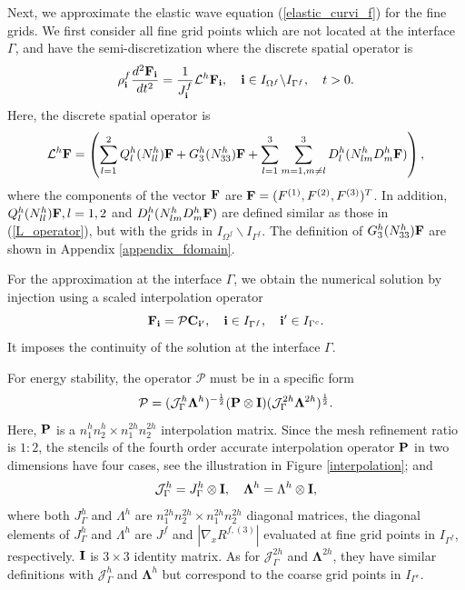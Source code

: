 Next, we approximate the elastic wave equation (\ref{elastic_curvi_f}) for the fine grids. We first consider all fine grid points which are not located at the interface $\Gamma$, and have the semi-discretization where the discrete spatial operator is
\begin{equation}\label{elastic_semi_f}
{\rho}_{\bf i}^{f}\frac{d^2{{\bf F}_{\bf i}}}{dt^2} = \frac{1}{J^f_{\bf i}}{\mathcal{L}}^{h} {{\bf F}}_{\bf i},\quad {\bf i}\in I_{\Omega^f}\backslash I_{{\Gamma^f}},\quad t>0.
\end{equation}
Here, the discrete spatial operator is
\begin{equation}\label{Lf_operator}
{\mathcal{L}}^{h} {{\bf F}} = \left(\sum_{l=1}^2{Q}_l^{h}({N}_{ll}^h){\bf F}+{G}_3^{h}({N}_{33}^h){\bf F}+\sum_{l=1}^3\sum_{m=1,m\neq l}^3{D}_l^{h}({N}_{lm}^{h}{D}_m^{h}{\bf F})\right),
\end{equation}
where the components of the vector ${\bf F}$ are ${\bf F} = (F^{(1)}, F^{(2)}, F^{(3)})^T$. In addition, ${Q}_l^{h}({N}_{ll}^h){\bf F}, l = 1,2$ and ${D}_l^{h}({N}_{lm}^{h}{D}_m^{h}{\bf F})$ are defined similar as those in (\ref{L_operator}), but with the grids in $I_{\Omega^f}\backslash I_{{\Gamma^f}}$. {\color{red} The definition of ${{G}}_3^{h}({N}_{33}^{h}){\bf F}$ are shown in Appendix \ref{appendix_fdomain}.}

For the approximation at the interface $\Gamma$, we obtain the numerical solution by injection using a scaled interpolation operator
\begin{equation}\label{continuous_sol}
{\bf F}_{\bf i} = {\mathcal{P}}{\bf C}_{{\bf i}'},\quad {\bf i}\in I_{\Gamma^f},\quad {{\bf i}'}\in I_{\Gamma^c}.
\end{equation}
It imposes the continuity of the solution at the interface $\Gamma$. 

For energy stability, the operator ${\mathcal{P}}$ must be in a specific form
\[{\mathcal{P}} = (\mathcal{J}^h_\Gamma \bm{\Lambda}^h)^{-\frac{1}{2}}({\bf P}\otimes{\bf I})(\mathcal{J}^{2h}_\Gamma \bm{\Lambda}^{2h})^{\frac{1}{2}}.\]
Here, ${\bf P}$ is a $n_1^hn_2^h\times n_1^{2h}n_2^{2h}$ interpolation matrix. Since the mesh refinement ratio is $1:2$, the stencils of the fourth order accurate interpolation operator ${\bf P}$ in two dimensions have four cases, see the illustration in  Figure \ref{interpolation}; and 
\[\mathcal{J}_{\Gamma}^h = J^{h}_{\Gamma} \otimes {\bf I},\quad {\bm{\Lambda}^h} = \Lambda^h\otimes {\bf I},\]
where both $J_{\Gamma}^h$ and $\Lambda^h$ are $n_1^{2h}n_2^{2h}\times n_1^{2h}n_2^{2h}$ diagonal matrices, the diagonal elements of $J_{\Gamma}^h$ and $\Lambda^{h}$ are $J^f$ and $|\nabla_x R^{f,(3)}|$ evaluated at fine grid points in $I_{\Gamma^f}$, respectively. ${\bf I}$ is $3\times 3$ identity matrix. As for $\mathcal{J}_{\Gamma}^{2h}$ and ${\bm{\Lambda}^{2h}}$, they have similar definitions with $\mathcal{J}_{\Gamma}^{h}$ and ${\bm{\Lambda}^{h}}$ but correspond to the coarse grid points in $I_{\Gamma^c}$.

